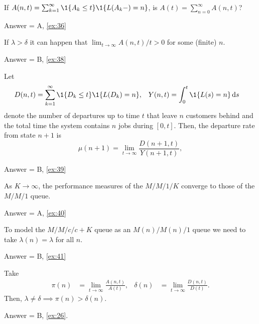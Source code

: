 \begin{exercise}[201904, 1] If   $A(n,t) = \sum_{k=1}^\infty \1{A_k \leq t}\1{L(A_k-) = n}$, is  $A(t) =\sum_{n=0}^\infty A(n,t)$?
\begin{solution} Answer = A, \ref{ex:36}
\end{solution}
\end{exercise}

\begin{exercise}[201904, 1]
If $\lambda>\delta$ it can happen that  $ \lim_{t\to\infty} A(n,t)/t > 0$ for some (finite) $n$. 
\begin{solution} Answer = B, \ref{ex:38}
\end{solution}
\end{exercise}

\begin{exercise}[201904, 1]
Let
\begin{align*}
    D(n,t) &= \sum_{k=1}^\infty \1{D_k \leq t} \1{L(D_k) = n}, &    Y(n,t) &= \int_0^t  \1{L(s) = n} \d s
  \end{align*}
  denote the number of departures up to time $t$ that leave $n$ customers behind and the total time the system contains $n$ jobs during $[0,t]$.
  Then, the departure rate from state $n+1$ is
\begin{equation*}
  \mu(n+1) = \lim_{t\to\infty} \frac{D(n+1,t)}{Y(n+1,t)},
\end{equation*}
\begin{solution} Answer = B, \ref{ex:39}
\end{solution}
\end{exercise}



\begin{exercise}[201904, 1] As $K\to\infty$, the performance measures of the $M/M/1/K$ converge to those of the $M/M/1$ queue. 
\begin{solution} Answer = A, \ref{ex:40}
\end{solution}
\end{exercise}


\begin{exercise}[201904, 1] To model the  $M/M/c/c+K$ queue as an $M(n)/M(n)/1$ queue we need to take $\lambda(n) = \lambda$ for all $n$.
\begin{solution} Answer = B, \ref{ex:41}
\end{solution}
\end{exercise}

\newpage

\begin{exercise}[201904, 1]
  Take
  \begin{align*}
    \pi(n) &= \lim_{t\to\infty} \frac{A(n,t)}{A(t)}, & 
    \delta(n) &= \lim_{t\to\infty} \frac{D(n,t)}{D(t)}. 
  \end{align*}
  Then, $\lambda\neq \delta \implies \pi(n) > \delta(n)$.
\begin{solution} Answer = B, \ref{ex:26}.
\end{solution}
\end{exercise}

